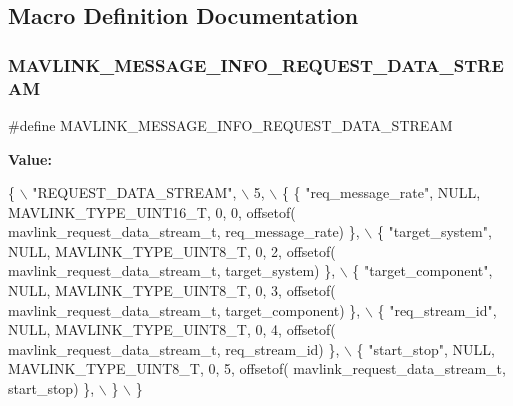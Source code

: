 \subsection{Macro Definition Documentation}
\mbox{\label{mavlink__msg__request__data__stream_8h_a9e1bb8ce5a80af80719d7a7348d479f3}} 
\subsubsection{M\+A\+V\+L\+I\+N\+K\+\_\+\+M\+E\+S\+S\+A\+G\+E\+\_\+\+I\+N\+F\+O\+\_\+\+R\+E\+Q\+U\+E\+S\+T\+\_\+\+D\+A\+T\+A\+\_\+\+S\+T\+R\+E\+AM}
{\footnotesize\ttfamily \#define M\+A\+V\+L\+I\+N\+K\+\_\+\+M\+E\+S\+S\+A\+G\+E\+\_\+\+I\+N\+F\+O\+\_\+\+R\+E\+Q\+U\+E\+S\+T\+\_\+\+D\+A\+T\+A\+\_\+\+S\+T\+R\+E\+AM}

{\bfseries Value\+:}
\begin{DoxyCode}
\{ \(\backslash\)
    \textcolor{stringliteral}{"REQUEST\_DATA\_STREAM"}, \(\backslash\)
    5, \(\backslash\)
    \{  \{ \textcolor{stringliteral}{"req\_message\_rate"}, NULL, MAVLINK_TYPE_UINT16_T, 0, 0, offsetof(
      mavlink_request_data_stream_t, req\_message\_rate) \}, \(\backslash\)
         \{ \textcolor{stringliteral}{"target\_system"}, NULL, MAVLINK_TYPE_UINT8_T, 0, 2, offsetof(
      mavlink_request_data_stream_t, target\_system) \}, \(\backslash\)
         \{ \textcolor{stringliteral}{"target\_component"}, NULL, MAVLINK_TYPE_UINT8_T, 0, 3, offsetof(
      mavlink_request_data_stream_t, target\_component) \}, \(\backslash\)
         \{ \textcolor{stringliteral}{"req\_stream\_id"}, NULL, MAVLINK_TYPE_UINT8_T, 0, 4, offsetof(
      mavlink_request_data_stream_t, req\_stream\_id) \}, \(\backslash\)
         \{ \textcolor{stringliteral}{"start\_stop"}, NULL, MAVLINK_TYPE_UINT8_T, 0, 5, offsetof(
      mavlink_request_data_stream_t, start\_stop) \}, \(\backslash\)
         \} \(\backslash\)
\}
\end{DoxyCode}
\mbox{\label{mavlink__msg__request__data__stream_8h_a9f94bbe7b49cc45d272afbd913231d84}} 
